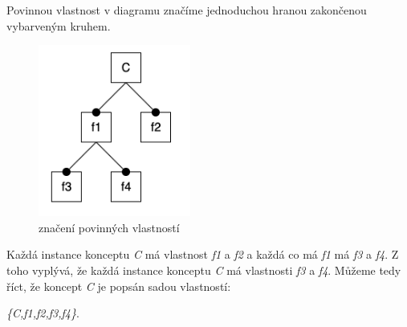Povinnou vlastnost v diagramu značíme jednoduchou hranou zakončenou vybarveným kruhem.
\begin{figure}[H]
	\centering
	\includegraphics[width=5cm]{images/mandatory}
	\caption{značení povinných vlastností}
\end{figure}

Každá instance konceptu \textit{C} má vlastnost \textit{f1} a \textit{f2} a každá co má \textit{f1} má \textit{f3} a \textit{f4}. Z toho vyplývá, že každá instance konceptu \textit{C} má vlastnosti \textit{f3} a \textit{f4}. Můžeme tedy říct, že koncept \textit{C} je popsán sadou vlastností:

\textit{\{C,f1,f2,f3,f4\}}.


